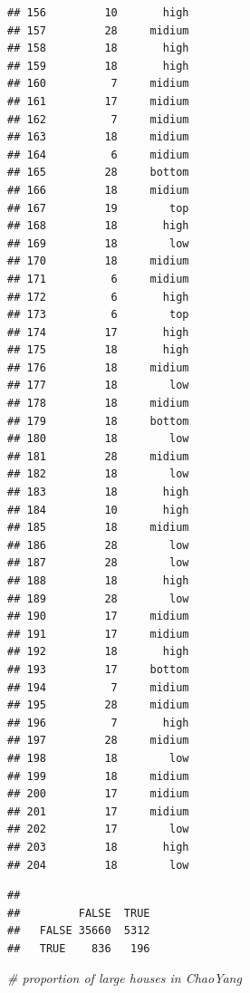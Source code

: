 \documentclass[
]{article}
\newenvironment{Shaded}{\begin{snugshade}}{\end{snugshade}}
\newcommand{\CommentTok}[1]{\textcolor[rgb]{0.56,0.35,0.01}{\textit{#1}}}
\newcommand{\DecValTok}[1]{\textcolor[rgb]{0.00,0.00,0.81}{#1}}
\newcommand{\FunctionTok}[1]{\textcolor[rgb]{0.00,0.00,0.00}{#1}}
\newcommand{\NormalTok}[1]{#1}
\newcommand{\SpecialCharTok}[1]{\textcolor[rgb]{0.00,0.00,0.00}{#1}}
\newcommand{\StringTok}[1]{\textcolor[rgb]{0.31,0.60,0.02}{#1}}
\begin{document}
\begin{verbatim}
## 156         10       high
## 157         28     midium
## 158         18       high
## 159         18       high
## 160          7     midium
## 161         17     midium
## 162          7     midium
## 163         18     midium
## 164          6     midium
## 165         28     bottom
## 166         18     midium
## 167         19        top
## 168         18       high
## 169         18        low
## 170         18     midium
## 171          6     midium
## 172          6       high
## 173          6        top
## 174         17       high
## 175         18       high
## 176         18     midium
## 177         18        low
## 178         18     midium
## 179         18     bottom
## 180         18        low
## 181         28     midium
## 182         18        low
## 183         18       high
## 184         10       high
## 185         18     midium
## 186         28        low
## 187         28        low
## 188         18       high
## 189         28        low
## 190         17     midium
## 191         17     midium
## 192         18       high
## 193         17     bottom
## 194          7     midium
## 195         28     midium
## 196          7       high
## 197         28     midium
## 198         18        low
## 199         18     midium
## 200         17     midium
## 201         17     midium
## 202         17        low
## 203         18       high
## 204         18        low
\end{verbatim}

\begin{Shaded}
\end{Shaded}

\begin{verbatim}
##        
##         FALSE  TRUE
##   FALSE 35660  5312
##   TRUE    836   196
\end{verbatim}

\begin{Shaded}
\begin{Highlighting}[]
\CommentTok{\# proportion of large houses in ChaoYang}
\end{Highlighting}
\end{Shaded}
\end{document}
